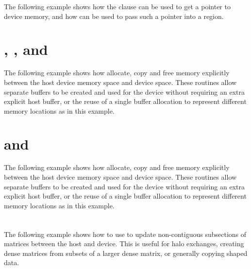 The following example shows how the  clause can be used
to get a pointer to device memory, and how  can be used
to pass such a pointer into a region. 



\section{, , and
    }

The following example shows how allocate, copy and free memory explicitly
between the host device memory space and device space.  These routines allow
separate buffers to be created and used for the device without
requiring an extra explicit host buffer, or the reuse of a single buffer
allocation to represent different memory locations as in this example.


\section{ and }

The following example shows how allocate, copy and free memory explicitly
between the host device memory space and device space.  These routines allow
separate buffers to be created and used for the device without
requiring an extra explicit host buffer, or the reuse of a single buffer
allocation to represent different memory locations as in this example.


\section{}

The following example shows how to use  to
update non-contiguous subsections of matrices between the host and device.
This is useful for halo exchanges, creating dense matrices from subsets of a
larger dense matrix, or generally copying shaped data.


